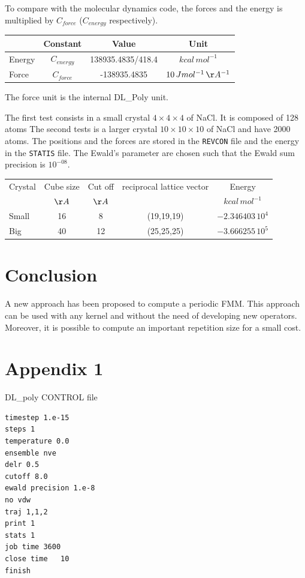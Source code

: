 \documentclass[12pt]{article} %
\begin{document}
To compare with the molecular dynamics code, the forces and the energy is multiplied by $C_{force}$ ($C_{energy}$ respectively). 
\begin{center}
\begin{tabular}{|l|c|c|c|}
\hline
   & Constant & Value &  Unit \\
\hline
Energy & $C_{energy}$& 138935.4835/418.4 &  $kcal\, mol^{-1}$\\
Force &$C_{force}$& -138935.4835 &  $10\,J  mol^{-1}\, \AA^{-1}$\\
\hline
\end{tabular}
\end{center}
The force unit is the internal DL\_Poly unit.


The first test consists in a small crystal $4\times 4\times 4$ of NaCl. It is composed of 128 atoms The second tests is a larger crystal  $10\times 10\times 10$ of NaCl and have 2000 atoms. The positions and the forces are stored in the \texttt{REVCON} file and the energy in the  \texttt{STATIS} file. The Ewald's parameter are chosen such that the  Ewald sum  precision is $10^{-08}$.
\begin{center}
\begin{tabular}{|l|c|c|c|c|}
\hline
Crystal & Cube size & Cut off & reciprocal lattice vector &Energy \\
        &  $\AA$    & $\AA$    &             & $kcal\, mol^{-1}$ \\
\hline
Small & 16 & 8 & (19,19,19) & $ -2.346403 \,10^{4}  $ \\
\hline
Big   & 40 & 12 & (25,25,25) & $-3.666255 \,10^{5}  $ \\
\hline
\end{tabular}
\end{center}
\section{Conclusion}
A new approach has been proposed to compute a periodic FMM.
This approach can be used with any kernel and without the need of developing new operators.
Moreover, it is possible to compute an important repetition size for a small cost.




\newpage
\section*{Appendix 1 }

\begin{center}
\large DL\_poly CONTROL file
\end{center}

\begin{verbatim}
timestep 1.e-15
steps 1
temperature 0.0
ensemble nve
delr 0.5
cutoff 8.0
ewald precision 1.e-8
no vdw
traj 1,1,2
print 1
stats 1
job time 3600
close time   10
finish
\end{verbatim}
\end{document}
